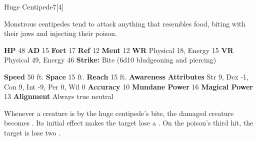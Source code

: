   \begin{monsection}{Huge Centipede}{7}[4]
    \vspace{-1em}\vspace{-1em}
    \vspace{0em}

    
    Monstrous centipedes tend to attack anything that resembles food, biting with their jaws and injecting their poison.
  
    

    \begin{spellcontent}
      \begin{spelltargetinginfo}
        \pari \textbf{HP} 48 \monsep
          \textbf{AD} 15 \monsep
          \textbf{Fort} 17 \monsep
          \textbf{Ref} 12 \monsep
          \textbf{Ment} 12
        \pari \textbf{WR} Physical 18, Energy 15 \monsep
        \textbf{VR} Physical 49, Energy 46
        \pari \textbf{Strike:}
            Bite  (6d10 bludgeoning and piercing)
      \end{spelltargetinginfo}
    \end{spellcontent}
    \begin{monsterfooter}
      \pari \textbf{Speed} 50 ft. \monsep
        \textbf{Space} 15 ft. \monsep
        \textbf{Reach} 15 ft.
      \pari \textbf{Awareness} 
      \pari \textbf{Attributes}
        Str 9, Dex -1,
        Con 9, Int -9,
        Per 0, Wil 0
      \pari \textbf{Accuracy} 10 \monsep
        \textbf{Mundane Power} 16 \monsep
      \textbf{Magical Power} 13
      \pari \textbf{Alignment} Always true neutral
    \end{monsterfooter}
  \end{monsection}
    Whenever a creature is  by the huge centipede's bite,
      the damaged creature becomes .
    Its initial effect makes the target lose a .
    On the poison's third hit, the target is lose two .
  
